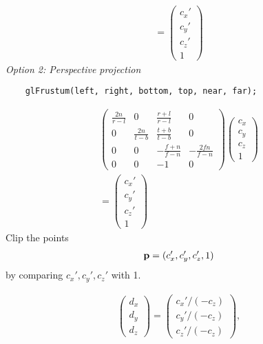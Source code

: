 \begin{compactdesc}
\begin{gather*}
		=
		\!\left(\!\begin{smallmatrix}
			c_x'\\
			c_y'\\
			c_z'\\
			1
		\end{smallmatrix}\!\right)\!
	\end{gather*}
	\emph{Option 2: Perspective projection}
	\begin{lstlisting}
	glFrustum(left, right, bottom, top, near, far);
	\end{lstlisting}
	\begin{gather*}
		\!\left(\!\begin{smallmatrix}
			\frac{2n}{r-l}&0&\frac{r+l}{r-l}&0\\
			0&\frac{2n}{t-b}&\frac{t+b}{t-b}&0\\
			0&0&-\frac{f+n}{f-n}&-\frac{2fn}{f-n}\\
			0&0&-1&0
		\end{smallmatrix}\!\right)\!
		\!\left(\!\begin{smallmatrix}
			c_x\\
			c_y\\
			c_z\\
			1
		\end{smallmatrix}\!\right)\!\\
		=
		\!\left(\!\begin{smallmatrix}
			c_x'\\
			c_y'\\
			c_z'\\
			1
		\end{smallmatrix}\!\right)\!
	\end{gather*}
	Clip the points
	\begin{gather*}
		\bm{\mathrm{p}}=(c_x',c_y',c_z',1)
	\end{gather*}
	by comparing $c_x',c_y',c_z'$ with 1.
\item[\lp{Perspective Division}]
	\begin{gather*}
		\!\left(\!\begin{smallmatrix}
			d_x\\
			d_y\\
			d_z
		\end{smallmatrix}\!\right)\!
		=
		\!\left(\!\begin{smallmatrix}
			c_x'/(-c_z)\\
			c_y'/(-c_z)\\
			c_z'/(-c_z)
		\end{smallmatrix}\!\right)\!,

\end{gather*}
\end{compactdesc}
